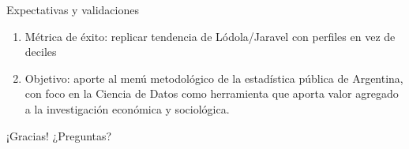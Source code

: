 \documentclass{beamer}
\begin{document}
\begin{frame}{Expectativas y validaciones}
\begin{enumerate}
    \item Métrica de éxito: replicar tendencia de Lódola/Jaravel con perfiles en vez de deciles
    \item Objetivo: aporte al menú metodológico de la estadística pública de Argentina, con foco en la Ciencia de Datos como herramienta que aporta valor agregado a la investigación económica y sociológica.
\end{enumerate}
\end{frame}

\begin{frame}{¡Gracias!}
\centering\huge¿Preguntas?
\end{frame}
\end{document}

